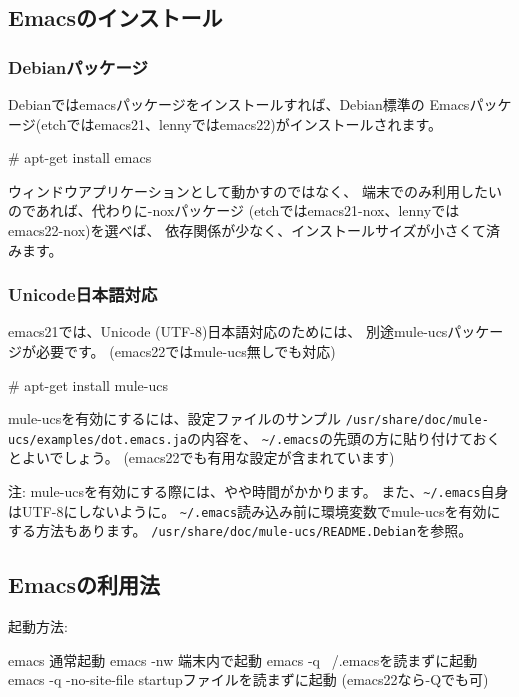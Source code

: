 \documentclass[mingoth,a4paper]{jsarticle}
\begin{document}
\subsection{Emacsのインストール}
\subsubsection{Debianパッケージ}

Debianではemacsパッケージをインストールすれば、Debian標準の
Emacsパッケージ(etchではemacs21、lennyではemacs22)がインストールされます。

\begin{commandline}
# apt-get install emacs
\end{commandline}

ウィンドウアプリケーションとして動かすのではなく、
端末でのみ利用したいのであれば、代わりに-noxパッケージ
(etchではemacs21-nox、lennyではemacs22-nox)を選べば、
依存関係が少なく、インストールサイズが小さくて済みます。

\subsubsection{Unicode日本語対応}

emacs21では、Unicode (UTF-8)日本語対応のためには、
別途mule-ucsパッケージが必要です。
(emacs22ではmule-ucs無しでも対応)

\begin{commandline}
# apt-get install mule-ucs
\end{commandline}

mule-ucsを有効にするには、設定ファイルのサンプル
\verb|/usr/share/doc/mule-ucs/examples/dot.emacs.ja|の内容を、
\verb|~/.emacs|の先頭の方に貼り付けておくとよいでしょう。
(emacs22でも有用な設定が含まれています)

注: mule-ucsを有効にする際には、やや時間がかかります。
また、\verb|~/.emacs|自身はUTF-8にしないように。
\verb|~/.emacs|読み込み前に環境変数でmule-ucsを有効にする方法もあります。
\verb|/usr/share/doc/mule-ucs/README.Debian|を参照。

\subsection{Emacsの利用法}

起動方法:

\begin{commandline}
emacs                 	通常起動
emacs -nw             	端末内で起動
emacs -q              	~/.emacsを読まずに起動
emacs -q -no-site-file	startupファイルを読まずに起動 (emacs22なら-Qでも可)
\end{commandline}
\end{document}
